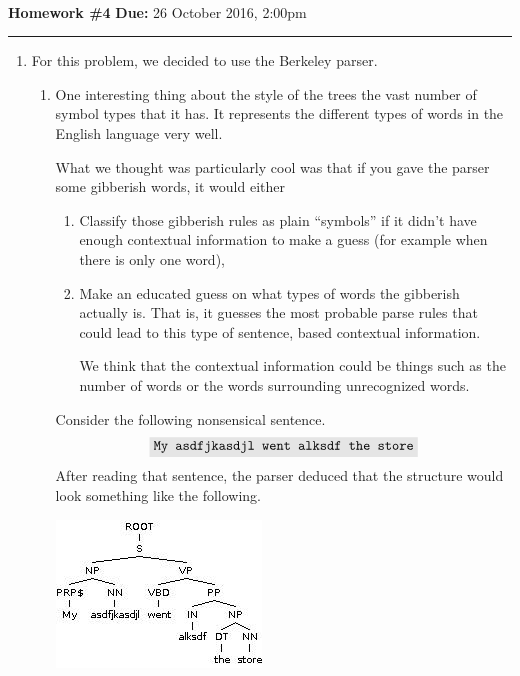 \documentclass[11pt]{article}
\newcommand{\codebox}[1]{\colorbox{codegray}{\texttt{#1}}}
\begin{document}
\\
{{\bf Homework \#4}} \hfill {{\bf Due:} 26 October 2016, 2:00pm} \vspace{6pt} \\
\rule[0.1in]{\textwidth}{0.4pt}

\begin{enumerate}
\item %
	For this problem, we decided to use the Berkeley parser.
	\begin{enumerate}[label=(\alph*)]
	\item
		One interesting thing about the style of the trees the vast number of symbol types that it has. It represents the different types of words in the English language very well.

		What we thought was particularly cool was that if you gave the parser some gibberish words, it would either
		\begin{enumerate}[label=(\roman*)]
			\item
				Classify those gibberish rules as plain ``symbols'' if it didn't have enough contextual information to make a guess (for example when there is only one word),
			\item
				Make an educated guess on what types of words the gibberish actually is.  That is, it guesses the most probable parse rules that could lead to this type of sentence, based contextual information.

				We think that the contextual information could be things such as the number of words or the words surrounding unrecognized words.
		\end{enumerate}
		Consider the following nonsensical sentence.
		\begin{eqnarray*}
			\codebox{My asdfjkasdjl went alksdf the store}
		\end{eqnarray*}
		After reading that sentence, the parser deduced that the structure would look something like the following.

		\includegraphics[scale=0.7]{gibparsetree.png}
		

\end{enumerate}
\end{enumerate}
\end{document}

